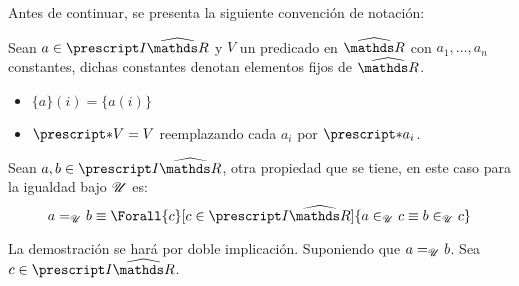 Antes de continuar, se presenta la siguiente convención de notación:
\begin{definition}
  Sean $a\in\IRh$ y $V$ un predicado en $\Rh$ con
  $a_1,\dots,a_n$ constantes, dichas constantes denotan elementos fijos
  de $\Rh$.
  \begin{itemize}
    \item $\{a\}(i) = \{a(i)\}$
    \item $\st{V} = V$ reemplazando cada $a_i$ por $\st{a_i}$.
  \end{itemize}
\end{definition}
Sean $a,b\in \IRh$, otra propiedad que se tiene, en este caso para
la igualdad bajo $\mathscr{U}$ es:
\[a \equ b \equiv \Forall{c}[c\in\IRh]{a\inu c \equiv b \inu c}\]
\begin{demo}
  La demostración se hará por doble implicación.
  Suponiendo que $a=_{\mathscr{U}} b$. Sea $c\in\IRh$.
  \begin{center}
  \end{center}


\end{demo}
